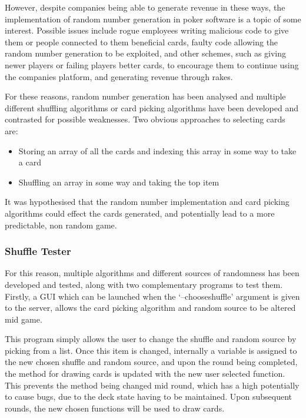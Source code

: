 However, despite companies being able to generate revenue in these ways, the
implementation of random number generation in poker software is a topic of
some interest. Possible issues include rogue employees writing malicious
code to give them or people connected to them beneficial cards, faulty code
allowing the random number generation to be exploited, and other schemes, such
as giving newer players or failing players better cards, to encourage them to 
continue using the companies platform, and generating revenue through rakes.

For these reasons, random number generation has been analysed and multiple
different shuffling algorithms or card picking algorithms have been
developed and contrasted for possible weaknesses. Two obvious approaches to 
selecting cards are:

\begin{itemize}
    \item Storing an array of all the cards and indexing this array in some way to take a card
    \item Shuffling an array in some way and taking the top item
\end{itemize}

It was hypothesised that the random number implementation and card picking
algorithms could effect the cards generated, and potentially lead to a more
predictable, non random game.

\subsubsection{Shuffle Tester}

For this reason, multiple algorithms and
different sources of randomness has been developed and tested, along with two
complementary programs to test them. Firstly, a GUI which can be launched
when the `--chooseshuffle' argument is given to the server, allows the card
picking algorithm and random source to be altered mid game.

This program simply allows the user to change the shuffle and random source
by picking from a list. Once this item is changed, internally a variable is
assigned to the new chosen shuffle and random source, and upon the round
being completed, the method for drawing cards is updated with the new user
selected function. This prevents the method being changed mid round, which
has a high potentially to cause bugs, due to the deck state having to be
maintained. Upon subsequent rounds, the new chosen functions will be used
to draw cards.


